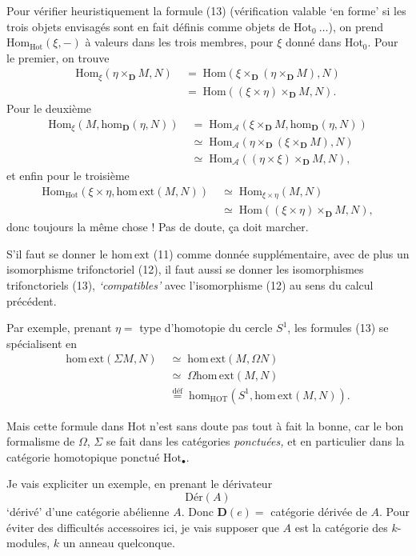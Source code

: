 \documentclass[11pt]{article}
\newcommand{\printedpage}[1]{\marginpar{\footnotesize p.~#1}}
\newcommand{\msp}[1]{\marginpar{\footnotesize [#1]}}
\newcommand{\Hot}{\mathrm{Hot}}
\newcommand{\D}{\mathbf{D}}
\newcommand{\hm}{\mathrm{hom}}
\newcommand{\Hom}{\mathrm{Hom}}
\newcommand{\homext}{\mathrm{hom}\,\mathrm{ext}}
\newcommand{\HOT}{\mathrm{HOT}}
\newcommand{\defeq}{\overset{\text{déf}}{=}}
\begin{document}
Pour vérifier heuristiquement la formule (13) (vérification valable ‘en forme’ si les trois objets envisagés sont en fait définis comme objets de $\Hot_0\ \ldots$), on prend $\Hom_{\Hot}(\xi,-)$ à valeurs dans les trois membres, pour $\xi$ donné dans $\Hot_0$. Pour le premier, on trouve
\[
\begin{aligned}
\Hom_{\xi}(\eta\times_{\D}M,N) &\;=\;\Hom(\xi\times_{\D}(\eta\times_{\D}M),N)\\
&\;=\;\Hom((\xi\times\eta)\times_{\D}M,N).
\end{aligned}
\]
Pour le deuxième
\[
\begin{aligned}
\Hom_{\xi}(M,\hm_{\D}(\eta,N)) &\;=\;\Hom_{\mathcal{A}}(\xi\times_{\D}M,\hm_{\D}(\eta,N))\\
&\;\simeq\;\Hom_{\mathcal{A}}(\eta\times_{\D}(\xi\times_{\D}M),N)\\
&\;\simeq\;\Hom_{\mathcal{A}}((\eta\times\xi)\times_{\D}M,N),
\end{aligned}
\]
\msp{page 10}
et enfin pour le troisième
\[
\begin{aligned}
\Hom_{\Hot}(\xi\times\eta,\homext(M,N)) &\;\simeq\;\Hom_{\xi\times\eta}(M,N)\\
&\;\simeq\;\Hom((\xi\times\eta)\times_{\D}M,N),
\end{aligned}
\]
donc toujours la même chose ! Pas de doute, ça doit marcher.

S’il faut se donner le $\homext$ (11) comme donnée supplémentaire, avec de plus un isomorphisme trifonctoriel (12), il faut aussi se donner les isomorphismes trifonctoriels (13), \textit{‘compatibles’} avec l’isomorphisme (12) au sens du calcul précédent.

\printedpage{7}

Par exemple, prenant $\eta=$ type d’homotopie du cercle $S^1$, les formules (13) se spécialisent en
\[
\begin{aligned}
\homext(\Sigma M,N) &\;\simeq\;\homext(M,\Omega N)\\
&\;\simeq\;\Omega\homext(M,N)\\
&\;\defeq\;\hm_{\HOT}(S^1,\homext(M,N)).
\end{aligned}
\tag*{(14)}
\]

Mais cette formule dans Hot n’est sans doute pas tout à fait la bonne, car le bon formalisme de $\Omega$, $\Sigma$ se fait dans les catégories \textit{ponctuées,} et en particulier dans la catégorie homotopique ponctué $\Hot_{\bullet}$. %

Je vais expliciter un exemple, en prenant le dérivateur
\[
\mathrm{Dér}(A)
\]
‘dérivé’ d’une catégorie abélienne $A$. Donc $\D(e)=$ catégorie dérivée de $A$. Pour éviter des
\msp{page 11}
difficultés accessoires ici, je vais supposer que $A$ est la catégorie des $k$-modules, $k$ un anneau quelconque.
\end{document}

